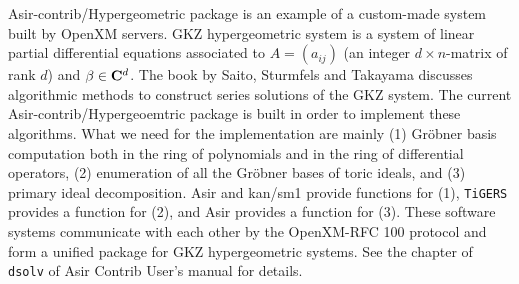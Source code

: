 Asir-contrib/Hypergeometric package is an 
example of a custom-made system built by OpenXM servers.
GKZ hypergeometric system is a system of linear partial differential
equations associated to $A=(a_{ij})$  
(an integer $d\times n$-matrix of rank $d$)
and $\beta \in {\bf C}^d$.
The book by Saito, Sturmfels and Takayama \cite{sst-book}
discusses algorithmic methods to construct series solutions of the GKZ
system.
The current Asir-contrib/Hypergeoemtric package is built in order to implement
these algorithms.
What we need for the implementation are mainly
(1) Gr\"obner basis computation both in the ring of polynomials
and in the ring of differential operators,
(2) enumeration of all the Gr\"obner bases of toric ideals,
and 
(3) primary ideal decomposition.
Asir and kan/sm1 provide functions for (1),
{\tt TiGERS} provides a function for (2),
and
Asir provides a function for (3).
These software systems communicate with each other 
by the OpenXM-RFC 100 protocol
and form a unified package for GKZ hypergeometric systems.
See the chapter of {\tt dsolv} of Asir Contrib User's manual \cite{openxm-web}
for details.


